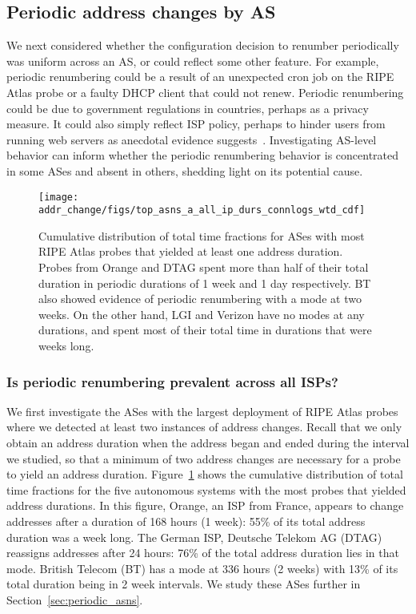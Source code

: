 \subsection{Periodic address changes by AS}
\label{sec:periodic-as}
We next considered whether the configuration decision to
renumber periodically was uniform across an AS, or could
reflect some other feature. For example, periodic
renumbering could be a result of an unexpected
cron job on the RIPE Atlas probe or a faulty DHCP client that
could not renew. Periodic renumbering could be due to government
regulations in countries, perhaps as a privacy measure. It could also
simply reflect ISP policy, perhaps to hinder users from running web servers as anecdotal
evidence suggests~\cite{forcedseparation}.  %
Investigating AS-level behavior can inform whether the periodic renumbering
behavior is concentrated in some ASes and absent in others, shedding light on its potential cause.


\begin{figure}[tb]
  \begin{center}
    \texttt{[image: addr\_change/figs/top\_asns\_a\_all\_ip\_durs\_connlogs\_wtd\_cdf]}
  \end{center}
  \caption{\label{fig:top_asns_all_durs}    
    Cumulative distribution of total time fractions for 
    ASes with most RIPE Atlas probes
    that yielded at least one address duration. Probes from Orange and
    DTAG spent more than half of their total duration in periodic
    durations of 1 week and 1 day respectively. BT also showed evidence
    of periodic renumbering with a mode at two weeks. On the other
    hand, LGI and Verizon have no modes at any durations, and spent
    most of their total time in durations that were weeks long.
  }
\end{figure}

\subsubsection{Is periodic renumbering prevalent across all ISPs?}

We first investigate the ASes with the largest deployment of RIPE
Atlas probes where we detected at least two instances of address
changes. Recall that we only obtain an address duration when the
address began and ended during the interval we studied, so that a
minimum of two address changes are necessary for a probe to yield an
address duration.  Figure~\ref{fig:top_asns_all_durs} shows the
cumulative distribution of total time fractions
for the five autonomous systems
with the most probes that yielded address durations. In this figure, Orange, an ISP from France, appears to change addresses
after a duration of 168 hours (1 week): 55\% of its total
address duration was a week long. The German ISP, Deutsche Telekom AG (DTAG)
reassigns addresses after 24 hours: 76\% of the total address duration
lies in that mode. British
Telecom (BT) has a mode at 336 hours (2 weeks) with 13\% of its
total duration being in 2 week intervals. We study these ASes further
in Section~\ref{sec:periodic_asns}.

